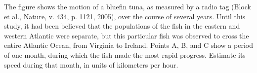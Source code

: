 The figure shows the motion of a bluefin tuna, as measured by
a radio tag (Block et al., Nature, v. 434, p. 1121, 2005), over the course
of several years. Until this study, it had been believed that the populations
of the fish in the eastern and western Atlantic were separate, but this 
particular fish was observed to cross the entire Atlantic Ocean, from Virginia
to Ireland. Points A, B, and C show a period of one month, during which the
fish made the most rapid progress. Estimate its speed during that month,
in units of kilometers per hour.\answercheck
